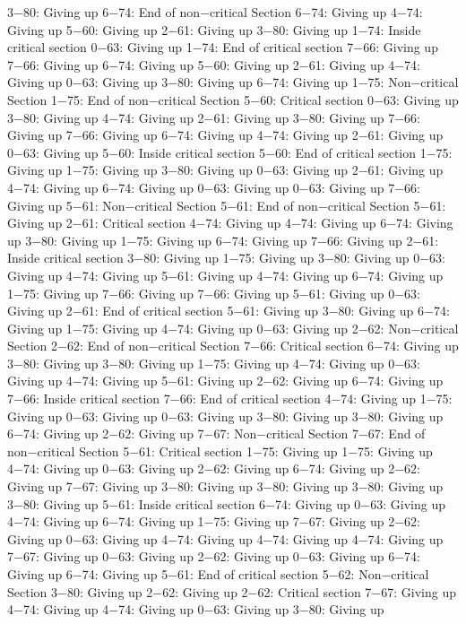 3−80: Giving up
6−74: End of non−critical Section
6−74: Giving up
4−74: Giving up
5−60: Giving up
2−61: Giving up
3−80: Giving up
1−74: Inside critical section
0−63: Giving up
1−74: End of critical section
7−66: Giving up
7−66: Giving up
6−74: Giving up
5−60: Giving up
2−61: Giving up
4−74: Giving up
0−63: Giving up
3−80: Giving up
6−74: Giving up
1−75: Non−critical Section
1−75: End of non−critical Section
5−60: Critical section
0−63: Giving up
3−80: Giving up
4−74: Giving up
2−61: Giving up
3−80: Giving up
7−66: Giving up
7−66: Giving up
6−74: Giving up
4−74: Giving up
2−61: Giving up
0−63: Giving up
5−60: Inside critical section
5−60: End of critical section
1−75: Giving up
1−75: Giving up
3−80: Giving up
0−63: Giving up
2−61: Giving up
4−74: Giving up
6−74: Giving up
0−63: Giving up
0−63: Giving up
7−66: Giving up
5−61: Non−critical Section
5−61: End of non−critical Section
5−61: Giving up
2−61: Critical section
4−74: Giving up
4−74: Giving up
6−74: Giving up
3−80: Giving up
1−75: Giving up
6−74: Giving up
7−66: Giving up
2−61: Inside critical section
3−80: Giving up
1−75: Giving up
3−80: Giving up
0−63: Giving up
4−74: Giving up
5−61: Giving up
4−74: Giving up
6−74: Giving up
1−75: Giving up
7−66: Giving up
7−66: Giving up
5−61: Giving up
0−63: Giving up
2−61: End of critical section
5−61: Giving up
3−80: Giving up
6−74: Giving up
1−75: Giving up
4−74: Giving up
0−63: Giving up
2−62: Non−critical Section
2−62: End of non−critical Section
7−66: Critical section
6−74: Giving up
3−80: Giving up
3−80: Giving up
1−75: Giving up
4−74: Giving up
0−63: Giving up
4−74: Giving up
5−61: Giving up
2−62: Giving up
6−74: Giving up
7−66: Inside critical section
7−66: End of critical section
4−74: Giving up
1−75: Giving up
0−63: Giving up
0−63: Giving up
3−80: Giving up
3−80: Giving up
6−74: Giving up
2−62: Giving up
7−67: Non−critical Section
7−67: End of non−critical Section
5−61: Critical section
1−75: Giving up
1−75: Giving up
4−74: Giving up
0−63: Giving up
2−62: Giving up
6−74: Giving up
2−62: Giving up
7−67: Giving up
3−80: Giving up
3−80: Giving up
3−80: Giving up
3−80: Giving up
5−61: Inside critical section
6−74: Giving up
0−63: Giving up
4−74: Giving up
6−74: Giving up
1−75: Giving up
7−67: Giving up
2−62: Giving up
0−63: Giving up
4−74: Giving up
4−74: Giving up
4−74: Giving up
7−67: Giving up
0−63: Giving up
2−62: Giving up
0−63: Giving up
6−74: Giving up
6−74: Giving up
5−61: End of critical section
5−62: Non−critical Section
3−80: Giving up
2−62: Giving up
2−62: Critical section
7−67: Giving up
4−74: Giving up
4−74: Giving up
0−63: Giving up
3−80: Giving up
